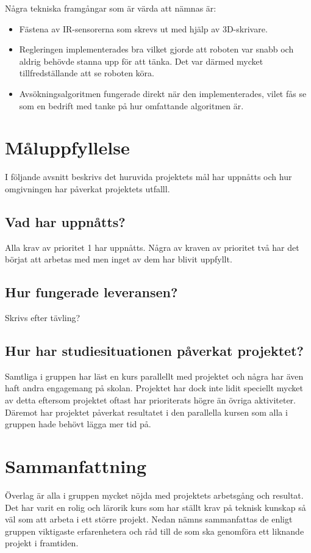 \documentclass[11pt]{article}
\begin{document}
Några tekniska framgångar som är värda att nämnas är:
\begin{itemize}
\item Fästena av IR-sensorerna som skrevs ut med hjälp av 3D-skrivare.
\item Regleringen implementerades bra vilket gjorde att roboten var snabb och aldrig behövde stanna upp för att tänka. Det var därmed mycket tillfredställande att se roboten köra. 
\item Avsökningsalgoritmen fungerade direkt när den implementerades, vilet fås se som en bedrift med tanke på hur omfattande algoritmen är. 
\end{itemize} 

\section{Måluppfyllelse}
I följande avsnitt beskrivs det huruvida projektets mål har uppnåtts och hur omgivningen har påverkat projektets utfalll.

\subsection{Vad har uppnåtts?}
Alla krav av prioritet 1 har uppnåtts. Några av kraven av prioritet två har det börjat att arbetas med men inget av dem har blivit uppfyllt.

\subsection{Hur fungerade leveransen?}
Skrivs efter tävling?

\subsection{Hur har studiesituationen påverkat projektet?}
Samtliga i gruppen har läst en kurs parallellt med projektet och några har även haft andra engagemang på skolan. Projektet har dock inte lidit speciellt mycket av detta eftersom projektet oftast har prioriterats högre än övriga aktiviteter. Däremot har projektet påverkat resultatet i den parallella kursen som alla i gruppen hade behövt lägga mer tid på.  

\section{Sammanfattning}
Överlag är alla i gruppen mycket nöjda med projektets arbetsgång och resultat. Det har varit en rolig och lärorik kurs som har ställt krav på teknisk kunskap så väl som att arbeta i ett större projekt. Nedan nämns sammanfattas de enligt gruppen viktigaste erfarenhetera och råd till de som ska genomföra ett liknande projekt i framtiden.
\end{document}
